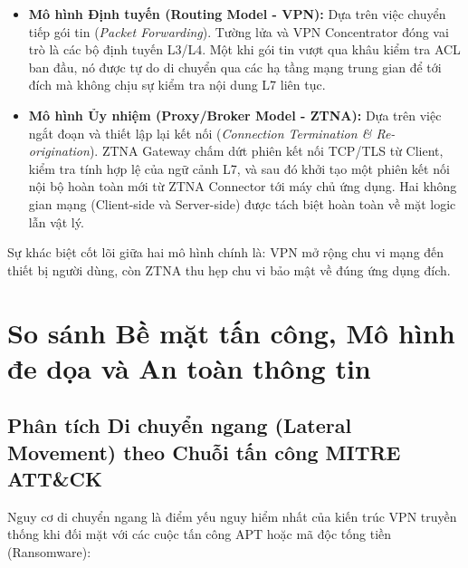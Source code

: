 \begin{itemize}
    \item \textbf{Mô hình Định tuyến (Routing Model - VPN):} Dựa trên việc chuyển tiếp gói tin (\textit{Packet Forwarding}). Tường lửa và VPN Concentrator đóng vai trò là các bộ định tuyến L3/L4. Một khi gói tin vượt qua khâu kiểm tra ACL ban đầu, nó được tự do di chuyển qua các hạ tầng mạng trung gian để tới đích mà không chịu sự kiểm tra nội dung L7 liên tục.
    \item \textbf{Mô hình Ủy nhiệm (Proxy/Broker Model - ZTNA):} Dựa trên việc ngắt đoạn và thiết lập lại kết nối (\textit{Connection Termination \& Re-origination}). ZTNA Gateway chấm dứt phiên kết nối TCP/TLS từ Client, kiểm tra tính hợp lệ của ngữ cảnh L7, và sau đó khởi tạo một phiên kết nối nội bộ hoàn toàn mới từ ZTNA Connector tới máy chủ ứng dụng. Hai không gian mạng (Client-side và Server-side) được tách biệt hoàn toàn về mặt logic lẫn vật lý.
\end{itemize}

Sự khác biệt cốt lõi giữa hai mô hình chính là: VPN mở rộng chu vi mạng đến thiết bị người dùng, còn ZTNA thu hẹp chu vi bảo mật về đúng ứng dụng đích.

\section{So sánh Bề mặt tấn công, Mô hình đe dọa và An toàn thông tin}
\label{sec:4_2}

\subsection{Phân tích Di chuyển ngang (Lateral Movement) theo Chuỗi tấn công MITRE ATT\&CK}
\label{subsec:4_2_1}

Nguy cơ di chuyển ngang là điểm yếu nguy hiểm nhất của kiến trúc VPN truyền thống khi đối mặt với các cuộc tấn công APT hoặc mã độc tống tiền (Ransomware):

